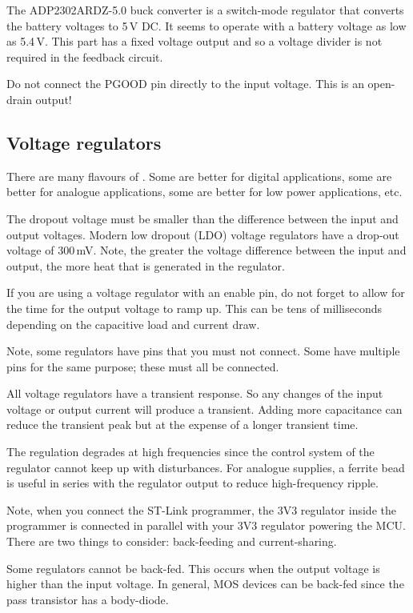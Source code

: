 The ADP2302ARDZ-5.0 buck converter is a switch-mode regulator that
converts the battery voltages to 5\,V DC.  It seems to operate with a
battery voltage as low as 5.4\,V.  This part has a fixed voltage
output and so a voltage divider is not required in the feedback
circuit.

Do not connect the PGOOD pin directly to the input voltage.  This is
an open-drain output!

\subsection{Voltage regulators}\label{voltage-regulators}

There are many flavours of .
Some are better for digital applications, some are better for analogue
applications, some are better for low power applications, etc.

The dropout voltage must be smaller than the difference between the
input and output voltages.  Modern low dropout (LDO) voltage
regulators have a drop-out voltage of 300\,mV.  Note, the greater the
voltage difference between the input and output, the more heat that is
generated in the regulator.

If you are using a voltage regulator with an enable pin, do not forget
to allow for the time for the output voltage to ramp up. This can be
tens of milliseconds depending on the capacitive load and current draw.

Note, some regulators have pins that you must not connect. Some have
multiple pins for the same purpose; these must all be connected.

All voltage regulators have a transient response.  So any changes of
the input voltage or output current will produce a transient.  Adding
more capacitance can reduce the transient peak but at the expense of a
longer transient time.

The regulation degrades at high frequencies since the control system
of the regulator cannot keep up with disturbances.  For analogue
supplies, a ferrite bead is useful in series with the regulator output
to reduce high-frequency ripple.


Note, when you connect the ST-Link programmer, the 3V3 regulator
inside the programmer is connected in parallel with your 3V3 regulator
powering the MCU.  There are two things to consider: back-feeding and
current-sharing.

Some regulators cannot be back-fed.  This occurs when the output
voltage is higher than the input voltage.  In general, MOS devices can
be back-fed since the pass transistor has a body-diode.

